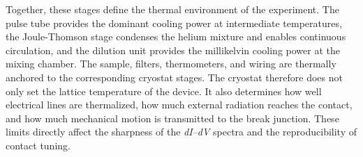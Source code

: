         Together, these stages define the thermal environment of the experiment. The pulse tube provides the dominant cooling power at intermediate temperatures, the Joule-Thomson stage condenses the helium mixture and enables continuous circulation, and the dilution unit provides the millikelvin cooling power at the mixing chamber. The sample, filters, thermometers, and wiring are thermally anchored to the corresponding cryostat stages. The cryostat therefore does not only set the lattice temperature of the device. It also determines how well electrical lines are thermalized, how much external radiation reaches the contact, and how much mechanical motion is transmitted to the break junction. These limits directly affect the sharpness of the \textit{dI--dV} spectra and the reproducibility of contact tuning.
